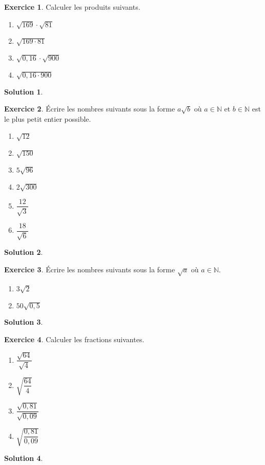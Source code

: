 \documentclass[a4paper, 14pt]{extarticle}
\theoremstyle{plain}
\newtheorem*{sol}{Solution}
\theoremstyle{definition}
\newtheorem{ex}{Exercice}
\newcommand{\N}{\mathbb{N}}
\newcommand{\exe}[2]{
		\begin{ex} #1  \end{ex}
		\begin{sol} #2 \end{sol}
	}
\newcommand{\exe}[2]{
		\begin{ex} #1  \end{ex}
	}
\begin{document}
\exe{
	Calculer les produits suivants.
	\begin{multicols}{2}
	\begin{enumerate}
		\item $\sqrt{169} \cdot \sqrt{81}$
		\item $\sqrt{169 \cdot 81}$
		\item $\sqrt{0,16} \cdot \sqrt{900}$
		\item $\sqrt{0,16 \cdot 900}$
	\end{enumerate}
	\end{multicols}
}{}

\exe{
	Écrire les nombres suivants sous la forme $a\sqrt{b}$ où $a\in\N$ et $b\in\N$ est le plus petit entier possible.

	\begin{multicols}{2}
	\begin{enumerate}
		\item $\sqrt{12}$
		\item $\sqrt{150}$
		\item $5\sqrt{96}$
		\item $2\sqrt{300}$
		\item $\dfrac{12}{\sqrt{3}}$
		\item $\dfrac{18}{\sqrt{6}}$
	\end{enumerate}
	\end{multicols}
}{}


\exe{
	Écrire les nombres suivants sous la forme $\sqrt{a}$ où $a\in\N$.
	\begin{multicols}{2}
	\begin{enumerate}
		\item $3\sqrt{2}$
		\item $50\sqrt{0,5}$
	\end{enumerate}
	\end{multicols}
}{}

\newpage 
\exe{
	Calculer les fractions suivantes.
	\begin{multicols}{2}
	\begin{enumerate}
		\item $\dfrac{\sqrt{64}}{\sqrt{4}}$
		\item $\sqrt{\dfrac{64}4}$
		\item $\dfrac{\sqrt{0,81}}{\sqrt{0,09}}$
		\item $\sqrt{\dfrac{0,81}{0,09}}$
	\end{enumerate}
	\end{multicols}
}{}
\end{document}
